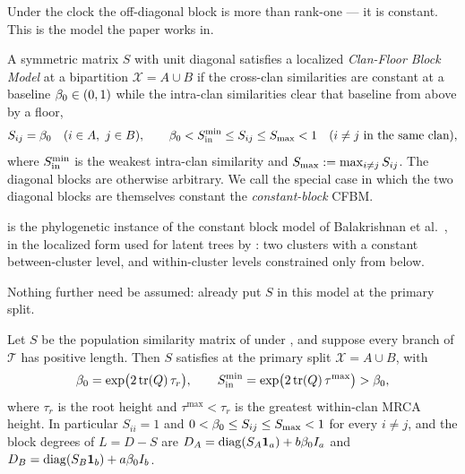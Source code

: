 Under the clock the off-diagonal block is more than rank-one --- it is constant.
This is the model the paper works in.

\begin{definition}\label{def:cfbm}
A symmetric matrix $S$ with unit diagonal satisfies a localized \emph{Clan-Floor
Block Model} at a bipartition $\mathcal{X} = A \cup B$ if the cross-clan
similarities are constant at a baseline $\beta_0 \in (0,1)$ while the intra-clan
similarities clear that baseline from above by a floor,
\begin{equation}\label{eq:cfbm_floor}
   S_{ij}=\beta_0\quad(i\in A,\ j\in B),
   \qquad
   \beta_0<S_{\mathrm{in}}^{\min}\le S_{ij}\le S_{\max}<1\quad(i\ne j\ \text{in the same clan}),
\end{equation}
where $S_{\mathrm{in}}^{\min}$ is the weakest intra-clan similarity and
$S_{\max} := \max_{i \ne j} S_{ij}$. The diagonal blocks are otherwise arbitrary. We
call the special case in which the two diagonal blocks are themselves constant the
\emph{constant-block} CFBM.
\end{definition}

\noindent {} is the phylogenetic instance of the constant block model
of Balakrishnan et al.\ \cite{Balakrishnan2011clustering}, in the localized form
used for latent trees by \cite{aizenbud2023spectral}: two clusters with a constant
between-cluster level, and within-cluster levels constrained only from below.


Nothing further need be assumed:  already put $S$ in this
model at the primary split.

\begin{proposition}\label{prop:cfbm}
Let $S$ be the population similarity matrix of  under
, and suppose every branch of $\mathcal{T}$ has positive
length. Then $S$ satisfies  at the primary split
$\mathcal{X} = A \cup B$, with
\begin{equation}\label{eq:cfbm_from_model}
   \beta_0 = \exp\bigl(2\,\mathrm{tr}(Q)\,\tau_r\bigr),
   \qquad
   S_{\mathrm{in}}^{\min} = \exp\bigl(2\,\mathrm{tr}(Q)\,\tau^{\max}\bigr) > \beta_0,
\end{equation}
where $\tau_r$ is the root height and $\tau^{\max} < \tau_r$ is the greatest
within-clan MRCA height. In particular $S_{ii}=1$ and $0 < \beta_0 \le S_{ij} \le
S_{\max} < 1$ for every $i \ne j$, and the block degrees of $L = D - S$ are
$D_A=\operatorname{diag}(S_A\mathbf{1}_a)+b\beta_0 I_a$ and
$D_B=\operatorname{diag}(S_B\mathbf{1}_b)+a\beta_0 I_b$.
\end{proposition}


